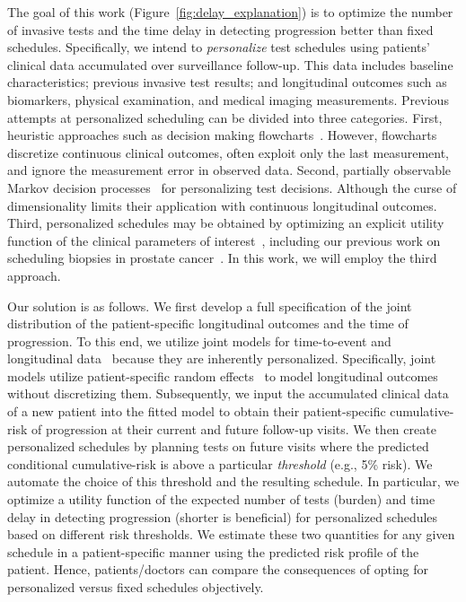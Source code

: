 \documentclass[useAMS, usenatbib, referee]{biom}
\begin{document}
The goal of this work (Figure~\ref{fig:delay_explanation}) is to optimize the number of invasive tests and the time delay in detecting progression better than fixed schedules. Specifically, we intend to \emph{personalize} test schedules using patients' clinical data accumulated over surveillance follow-up. This data includes baseline characteristics; previous invasive test results; and longitudinal outcomes such as biomarkers, physical examination, and medical imaging measurements. Previous attempts at personalized scheduling can be divided into three categories. First, heuristic approaches such as decision making flowcharts~\citep{bokhorst2015compliance,weusten2017endoscopic}. However, flowcharts discretize continuous clinical outcomes, often exploit only the last measurement, and ignore the measurement error in observed data. Second, partially observable Markov decision processes~\citep{alagoz2010operations, steimle2017markov} for personalizing test decisions. Although the curse of dimensionality limits their application with continuous longitudinal outcomes. Third, personalized schedules may be obtained by optimizing an explicit utility function of the clinical parameters of interest~\citep{bebu2017optimal,rizopoulos2015personalized}, including our previous work on scheduling biopsies in prostate cancer~\citep{tomer2019personalized,tomer2020webapp}. In this work, we will employ the third approach.

Our solution is as follows. We first develop a full specification of the joint distribution of the patient-specific longitudinal outcomes and the time of progression. To this end, we utilize joint models for time-to-event and longitudinal data~\citep{tsiatis2004joint,rizopoulos2012joint} because they are inherently personalized. Specifically, joint models utilize patient-specific random effects~\citep{mcculloch2005generalized} to model longitudinal outcomes without discretizing them. Subsequently, we input the accumulated clinical data of a new patient into the fitted model to obtain their patient-specific cumulative-risk of progression at their current and future follow-up visits. We then create personalized schedules by planning tests on future visits where the predicted conditional cumulative-risk is above a particular \emph{threshold} (e.g., 5\% risk). We automate the choice of this threshold and the resulting schedule. In particular, we optimize a utility function of the expected number of tests (burden) and time delay in detecting progression (shorter is beneficial) for personalized schedules based on different risk thresholds. We estimate these two quantities for any given schedule in a patient-specific manner using the predicted risk profile of the patient. Hence, patients/doctors can compare the consequences of opting for personalized versus fixed schedules objectively.
\end{document}
